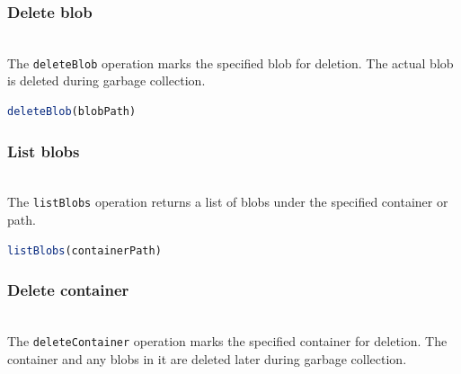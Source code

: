 \subsubsection{Delete blob}\label{6Dm8r3h1fAcmQNM_GKJDP}
\\
The \texttt{deleteBlob} operation marks the specified blob for deletion. The actual blob is deleted during garbage collection.

\begin{lstlisting}[language=JavaScript]
deleteBlob(blobPath)
\end{lstlisting}

\begin{table}[htbp]
\centering
\small
{}
\end{table}

\subsubsection{List blobs}\label{y9OR2-iae4eYUERptOvMp}
\\
The \texttt{listBlobs} operation returns a list of blobs under the specified container or path.

\begin{lstlisting}[language=JavaScript]
listBlobs(containerPath)
\end{lstlisting}

\begin{table}[htbp]
\centering
\small
{}
\end{table}

\subsubsection{Delete container}\label{tleRe6eXYSMUnHZyvnStq}
\\
The \texttt{deleteContainer} operation marks the specified container for deletion. The container and any blobs in it are deleted later during garbage collection.

